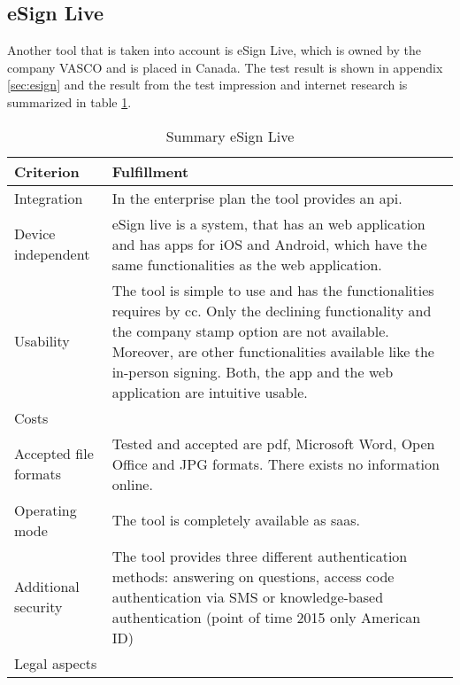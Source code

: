 \subsection{eSign Live}
Another tool that is taken into account is eSign Live, which is owned by the company VASCO and is placed in Canada. The test result is shown in appendix \ref{sec:esign} and the result from the test impression and internet research is summarized in table \ref{tab:esign}.
\begin{table}[h!]
	\begin{tabular}{|p{4cm}|p{10cm}|} \hline
		Criterion & Fulfillment \\ \hline
		Integration & In the enterprise plan the tool provides an \gls{api}. \parencite{esign2018info} \\ \hline
		Device independent & eSign live is a system, that has an web application and has \glspl{app} for iOS and Android, which have the same functionalities as the web application. \parencite{esign2018info} \\ \hline
		Usability & The tool is simple to use and has the functionalities requires by \gls{cc}. Only the declining functionality and the company stamp option are not available. Moreover, are other functionalities available like the in-person signing. Both, the \gls{app} and the web application are intuitive usable.  \\ \hline
		Costs & \\ \hline
		Accepted file formats & Tested and accepted are \gls{pdf}, Microsoft Word, Open Office and JPG formats. There exists no information online.\\ \hline
		Operating mode & The tool is completely available as \gls{saas}.\\ \hline
		Additional security & The tool provides three different authentication methods: answering on questions, access code authentication via SMS or knowledge-based authentication (point of time 2015 only American ID) \parencite{esign2018security} \\ \hline
		Legal aspects & \\ \hline
	\end{tabular}
	\caption{Summary eSign Live}
	\label{tab:esign}
\end{table}


